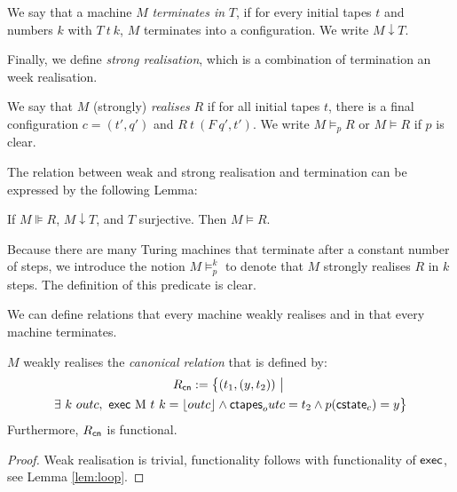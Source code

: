 \documentclass{psartcl}
\begin{document}
\begin{definition}[Termination]
  \label{def:termination}
  We say that a machine $M$ \emph{terminates in} $T$, if for every initial tapes $t$ and numbers $k$ with $T~t~k$,
  $M$ terminates into a configuration.
  We write $M \downarrow T$.
\end{definition}

Finally, we define \emph{strong realisation}, which is a combination of termination an week realisation.

\begin{definition}
  \label{def:realise}
  We say that $M$ (strongly) \emph{realises} $R$ if for all initial tapes $t$,
  there is a final configuration $c=(t', q')$ and $R~t~(F~q', t')$.
  We write $M \vDash_p R$ or $M \vDash R$ if $p$ is clear.
\end{definition}

The relation between weak and strong realisation and termination can be expressed by the following Lemma:

\begin{lemma}
  \label{lem:wrealise-realise}
  If $M \VDash R$, $M \downarrow T$, and $T$ surjective.  Then $M \vDash R$.
\end{lemma}

Because there are many Turing machines that terminate after a constant number of steps, we introduce the notion $M \vDash_p^k$ to denote that $M$
strongly realises $R$ in $k$ steps.  The definition of this predicate is clear.

We can define relations that every machine weakly realises and in that every machine terminates.

\begin{lemma}
  \label{lem:canonical-relation}
  $M$ weakly realises the \emph{canonical relation} that is defined by:
  \begin{multline*}
    R_{\MS{cn}} := \setMap{(t_1, (y, t_2))}{\\
      \exists~k~outc,~ \MS{exec}~$M$~t~k = \Some{outc} \land \MS{ctapes}_outc = t_2 \land p(\MS{cstate}_c) = y}
    \end{multline*}
    Furthermore, $R_{\textsf{cn}}$ is functional.
\end{lemma}
\begin{proof}
  Weak realisation is trivial, functionality follows with functionality of $\textsf{exec}$, see Lemma \ref{lem:loop}.
\end{proof}
\end{document}
